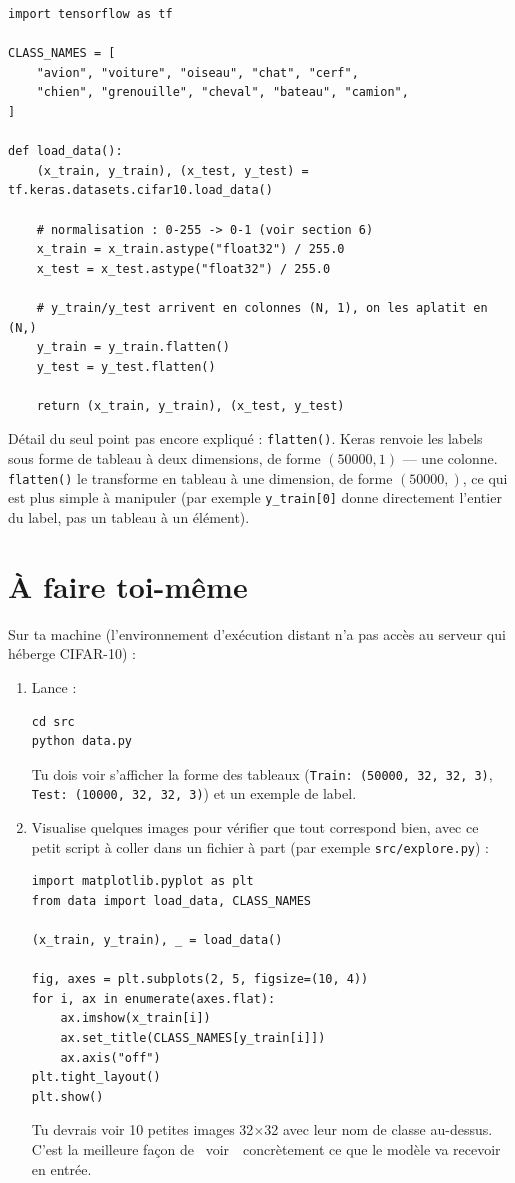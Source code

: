 \documentclass[11pt,a4paper]{article}
\begin{document}
\begin{lstlisting}
import tensorflow as tf

CLASS_NAMES = [
    "avion", "voiture", "oiseau", "chat", "cerf",
    "chien", "grenouille", "cheval", "bateau", "camion",
]

def load_data():
    (x_train, y_train), (x_test, y_test) = tf.keras.datasets.cifar10.load_data()

    # normalisation : 0-255 -> 0-1 (voir section 6)
    x_train = x_train.astype("float32") / 255.0
    x_test = x_test.astype("float32") / 255.0

    # y_train/y_test arrivent en colonnes (N, 1), on les aplatit en (N,)
    y_train = y_train.flatten()
    y_test = y_test.flatten()

    return (x_train, y_train), (x_test, y_test)
\end{lstlisting}

D\'etail du seul point pas encore expliqu\'e : \texttt{flatten()}. Keras
renvoie les labels sous forme de tableau \`a deux dimensions, de forme
$(50000, 1)$ --- une colonne. \texttt{flatten()} le transforme en tableau
\`a une dimension, de forme $(50000,)$, ce qui est plus simple \`a
manipuler (par exemple \texttt{y\_train[0]} donne directement l'entier du
label, pas un tableau \`a un \'el\'ement).

\section{\`A faire toi-m\^eme}

Sur ta machine (l'environnement d'ex\'ecution distant n'a pas acc\`es au
serveur qui h\'eberge CIFAR-10) :

\begin{enumerate}
  \item Lance :
\begin{lstlisting}
cd src
python data.py
\end{lstlisting}
  Tu dois voir s'afficher la forme des tableaux
  (\texttt{Train: (50000, 32, 32, 3)}, \texttt{Test: (10000, 32, 32, 3)})
  et un exemple de label.

  \item Visualise quelques images pour v\'erifier que tout correspond
  bien, avec ce petit script \`a coller dans un fichier \`a part
  (par exemple \texttt{src/explore.py}) :
\begin{lstlisting}
import matplotlib.pyplot as plt
from data import load_data, CLASS_NAMES

(x_train, y_train), _ = load_data()

fig, axes = plt.subplots(2, 5, figsize=(10, 4))
for i, ax in enumerate(axes.flat):
    ax.imshow(x_train[i])
    ax.set_title(CLASS_NAMES[y_train[i]])
    ax.axis("off")
plt.tight_layout()
plt.show()
\end{lstlisting}
  Tu devrais voir 10 petites images 32$\times$32 avec leur nom de classe
  au-dessus. C'est la meilleure fa\c{c}on de \guillemotleft~voir~\guillemotright\ concr\`etement
  ce que le mod\`ele va recevoir en entr\'ee.
\end{enumerate}
\end{document}
